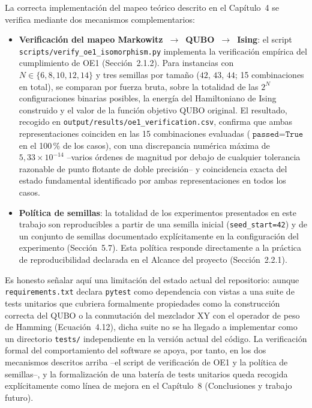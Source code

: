 La correcta implementación del mapeo teórico descrito en el Capítulo~4 se verifica mediante dos mecanismos complementarios:

\begin{itemize}
    \item \textbf{Verificación del mapeo Markowitz~$\rightarrow$~QUBO~$\rightarrow$~Ising}: el script \texttt{scripts/verify\_oe1\_isomorphism.py} implementa la verificación empírica del cumplimiento de OE1 (Sección~2.1.2). Para instancias con $N \in \{6, 8, 10, 12, 14\}$ y tres semillas por tamaño ($42$, $43$, $44$; 15 combinaciones en total), se comparan por fuerza bruta, sobre la totalidad de las $2^N$ configuraciones binarias posibles, la energía del Hamiltoniano de Ising construido y el valor de la función objetivo QUBO original. El resultado, recogido en \texttt{output/results/oe1\_verification.csv}, confirma que ambas representaciones coinciden en las 15 combinaciones evaluadas ($\texttt{passed}=\texttt{True}$ en el 100\,\% de los casos), con una discrepancia numérica máxima de $5{,}33\times10^{-14}$ --varios órdenes de magnitud por debajo de cualquier tolerancia razonable de punto flotante de doble precisión-- y coincidencia exacta del estado fundamental identificado por ambas representaciones en todos los casos.
    \item \textbf{Política de semillas}: la totalidad de los experimentos presentados en este trabajo son reproducibles a partir de una semilla inicial (\texttt{seed\_start=42}) y de un conjunto de semillas documentado explícitamente en la configuración del experimento (Sección~5.7). Esta política responde directamente a la práctica de reproducibilidad declarada en el Alcance del proyecto (Sección~2.2.1).
\end{itemize}

Es honesto señalar aquí una limitación del estado actual del repositorio: aunque \texttt{requirements.txt} declara \texttt{pytest} como dependencia con vistas a una suite de tests unitarios que cubriera formalmente propiedades como la construcción correcta del QUBO o la conmutación del mezclador XY con el operador de peso de Hamming (Ecuación~4.12), dicha suite no se ha llegado a implementar como un directorio \texttt{tests/} independiente en la versión actual del código. La verificación formal del comportamiento del software se apoya, por tanto, en los dos mecanismos descritos arriba --el script de verificación de OE1 y la política de semillas--, y la formalización de una batería de tests unitarios queda recogida explícitamente como línea de mejora en el Capítulo~8 (Conclusiones y trabajo futuro).

